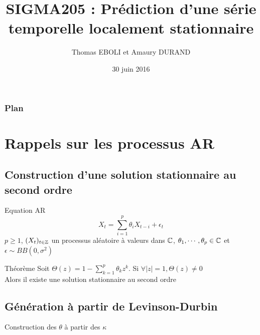 \documentclass[11pt]{beamer}
\author{Thomas EBOLI et Amaury DURAND}
\title[SIGMA205]{SIGMA205 : Prédiction d'une série temporelle localement stationnaire}
\institute{Télécom ParisTech}
\date{30 juin 2016}
\begin{document}
\begin{frame}
\titlepage
\end{frame}

\begin{frame}
\frametitle{Plan}
\tableofcontents
\end{frame}

\section{Rappels sur les processus AR}
\subsection{Construction d'une solution stationnaire au second ordre}
\begin{frame}
\begin{block}{Equation AR}
\begin{equation}\label{eq:AR}
X_t = \sum_{i=1}^p \theta_i X_{t-i} + \epsilon_t
\tag{AR}
\end{equation}
$p\geq 1$, $(X_t)_{t\in \mathbb{Z}}$ un processus aléatoire à valeurs dans $\mathbb{C}$, $\theta_1,\cdots,\theta_p \in \mathbb{C}$ et $\epsilon \sim BB(0,\sigma^2)$
\end{block}

\begin{alertblock}{Théorème}
Soit $\Theta(z)=1-\sum_{k=1}^p \theta_k z^k$. Si $\forall |z|=1, \Theta(z)\neq 0$ \\
Alors il existe une solution stationnaire au second ordre
\end{alertblock}
\end{frame}

\subsection{Génération à partir de Levinson-Durbin}
\begin{frame}
\begin{algorithm}[H]
 \caption{Construction des $\theta$ à partir  des $\kappa$}
 \label{algo:construction}
\end{algorithm}
\end{frame}
\end{document}
